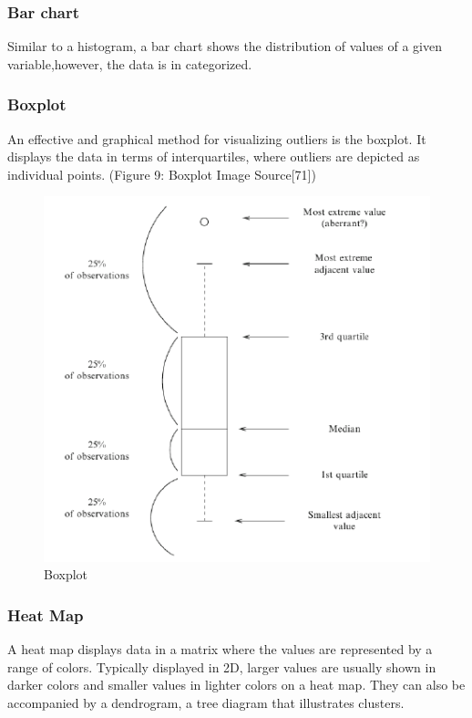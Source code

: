 \documentclass[12pt,]{article}
\begin{document}
\subsubsection{Bar chart}\label{bar-chart}

Similar to a histogram, a bar chart shows the distribution of values of
a given variable,however, the data is in categorized.

\subsubsection{Boxplot}\label{boxplot}

An effective and graphical method for visualizing outliers is the
boxplot. It displays the data in terms of interquartiles, where outliers
are depicted as individual points. (Figure 9: Boxplot Image
Source{[}71{]})

\begin{figure}

{\centering \includegraphics{thesis_files/figure-latex/unnamed-chunk-13-1} 

}

\caption{Boxplot}\label{fig:unnamed-chunk-13}
\end{figure}

\subsubsection{Heat Map}\label{heat-map}

A heat map displays data in a matrix where the values are represented by
a range of colors. Typically displayed in 2D, larger values are usually
shown in darker colors and smaller values in lighter colors on a heat
map. They can also be accompanied by a dendrogram, a tree diagram that
illustrates clusters.
\end{document}
